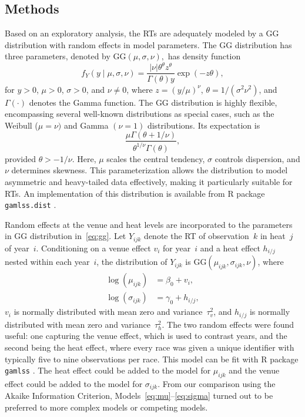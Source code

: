 \documentclass[12pt, letterpaper]{article}
\begin{document}
\subsection{Methods}
\label{sec:methods_barrier}


Based on an exploratory analysis, the RTs are adequately
modeled by a GG distribution with random effects in
model parameters. The GG distribution has three parameters, denoted by
$\text{GG}(\mu, \sigma, \nu),$ has density function
\begin{equation}
  \label{eq:gg}
f_Y(y \mid \mu, \sigma, \nu) =
\frac{|\nu| \theta^\theta z^{\theta}}{\Gamma(\theta) y}
\exp\left(-z \theta\right),
\end{equation}
for $y > 0$, $\mu > 0$, $\sigma > 0$, and $\nu \neq 0$,
where $z = (y / \mu)^\nu$,
$\theta = 1 / (\sigma^2 \nu^2)$, and
$\Gamma(\cdot)$ denotes the Gamma function.
The GG distribution is highly flexible, encompassing several
well-known distributions as special cases, such as the
Weibull ($\mu = \nu)$ and  Gamma $(\nu = 1)$ distributions.
Its expectation is
\[
  \frac{\mu \Gamma(\theta + 1 / \nu)}
  {\theta^{1 / \nu} \Gamma(\theta)},
\]
provided $\theta > -1 / \nu$. Here,
$\mu$ scales the central tendency, $\sigma$ controls
dispersion, and $\nu$ determines skewness. This parameterization allows
the distribution to model asymmetric and heavy-tailed data effectively, making
it particularly suitable for RTs.
An implementation of this distribution is available from R package
\texttt{gamlss.dist} \citep{rigby2019distributions}.


Random effects at the venue and heat levels are incorporated to the
parameters in GG distribution in~\eqref{eq:gg}.
Let $Y_{ijk}$ denote the RT of observation~$k$ in heat~$j$
of year~$i$. Conditioning on a venue effect $v_i$ for year~$i$
and a heat effect $h_{i/j}$ nested within each year~$i$, the
distribution of $Y_{ijk}$ is
$\text{GG}(\mu_{ijk}, \sigma_{ijk}, \nu)$, where
\begin{align}
\log(\mu_{ijk}) &= \beta_0 + v_i , \label{eq:mu}\\
\log(\sigma_{ijk}) &= \gamma_0 + h_{i/j} , \label{eq:sigma}
\end{align}
$v_i$ is normally distributed with mean zero and
variance~$\tau_v^2$, and $h_{i/j}$ is normally distributed with mean
zero and variance~$\tau_h^2$.
The two random effects were found useful: one 
capturing the venue effect, which is used to contrast years, and the 
second being the heat effect, where every race was given a unique 
identifier with typically five to nine observations per race.
This model can be fit with R package \texttt{gamlss} 
\citep{stasinopoulos2008generalized}. The heat effect could be added
to the model for $\mu_{ijk}$ and the venue effect could be added to 
the model for $\sigma_{ijk}$. From our comparison using the Akaike 
Information Criterion, Models~\eqref{eq:mu}--\eqref{eq:sigma} turned 
out to be preferred to more complex models or competing models.
\end{document}
